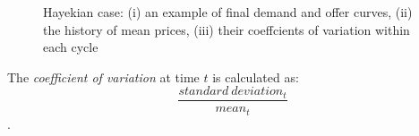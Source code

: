 \documentclass[12pt]{report}
\begin{document}
\begin{figure}[htbp]
\begin{center}
\caption{Hayekian case: (i) an example of final demand and offer curves, (ii) the history of mean prices, (iii) their coeffcients of variation within each cycle}
\label{output_3_1.png}
\end{center}
\end{figure}

The \emph{coefficient of variation} at time $t$ is calculated as: $$\frac{standard~deviation_t}{mean_t}$$.
\end{document}
